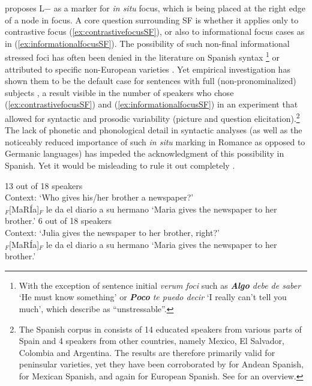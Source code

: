 \citet{Gabriel2007} proposes L$-$ as a marker for \textit{in situ} focus, 
which is being placed at the right edge of a node in focus. A core question surrounding \textsc{SF} is whether it applies only to contrastive focus (\ref{ex:contrastivefocusSF}), or also to informational focus cases as in (\ref{ex:informationalfocusSF}). The possibility of such non-final informational stressed foci has often been denied in the literature on Spanish syntax \citep{Zubizarreta98,Zubizarreta99}\footnote{With the exception of sentence initial \textit{verum foci} such as \textit{\textbf{Algo} debe de saber} `He must know something' or \textit{\textbf{Poco} te puedo decir} `I really can't tell you much', which \citet{Leonetti.2009} describe as ``unstressable''.} or attributed to specific non-European varieties \citep{Zubizarreta.2016}. Yet empirical investigation has shown them to be the default case for sentences with full (non-pronominalized) subjects \citep[289--294]{Gabriel2007}, a result visible in the number of speakers who chose (\ref{ex:contrastivefocusSF}) and (\ref{ex:informationalfocusSF}) in an experiment that allowed for syntactic and prosodic variability (picture and 
question elicitation).\footnote{The Spanish corpus in \citet[277]{Gabriel2007} consists of 14 educated speakers from various parts of Spain and 4 speakers from other countries, namely Mexico, El Salvador, Colombia and Argentina. The results are therefore primarily valid for peninsular varieties, yet they have been corroborated by \citet[426--427]{Muntendam.2010} for Andean Spanish, \citet{Hoot.2016} for Mexican Spanish, and \citet{VanrellFernandezSoriano.2018} again for European Spanish. See \citet[427--431]{DufterGabriel.2016} for an overview.} The lack of phonetic and phonological detail in syntactic analyses (as well as the noticeably reduced importance of such \textit{in situ} marking in Romance as opposed to 
Germanic languages) has impeded the acknowledgment of this possibility in Spanish. Yet it would be misleading to rule it out completely \citep[9--11]{UthGarcia.2018}.

\begin{exe}
	\ex\label{ex:informationalfocusSF} 13 out of 18 speakers \citep[289]{Gabriel2007}\\
	Context: `Who gives his/her brother a newspaper?'\\
	$_{F}$[MaRÍa]$_{F}$ le da el diario a su hermano 
	\glt ‘Maria gives the newspaper to her brother.’
	\ex\label{ex:contrastivefocusSF} 6 out of 18 speakers \citep[283]{Gabriel2007} \\
	Context: `Julia gives the newspaper to her brother, right?'  \\
	$_{F}$[MaRÍa]$_{F}$ le da el diario a su hermano 
	\glt ‘Maria gives the newspaper to her brother.’
\end{exe}

